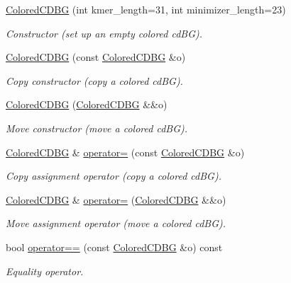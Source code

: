 \begin{DoxyCompactItemize}
\item 
\hyperlink{classColoredCDBG_aec6b5eb64fc7086bf81107849847071d}{Colored\+C\+D\+BG} (int kmer\+\_\+length=31, int minimizer\+\_\+length=23)
\begin{DoxyCompactList}\small\item\em Constructor (set up an empty colored cd\+BG). \end{DoxyCompactList}\item 
\hyperlink{classColoredCDBG_a8d2b4c5690efe813b6229a6e22343335}{Colored\+C\+D\+BG} (const \hyperlink{classColoredCDBG}{Colored\+C\+D\+BG} \&o)
\begin{DoxyCompactList}\small\item\em Copy constructor (copy a colored cd\+BG). \end{DoxyCompactList}\item 
\hyperlink{classColoredCDBG_a757b4744f396052946171021db1a1fb6}{Colored\+C\+D\+BG} (\hyperlink{classColoredCDBG}{Colored\+C\+D\+BG} \&\&o)
\begin{DoxyCompactList}\small\item\em Move constructor (move a colored cd\+BG). \end{DoxyCompactList}\item 
\hyperlink{classColoredCDBG}{Colored\+C\+D\+BG} \& \hyperlink{classColoredCDBG_a11b72ab0d9fb63f499a93f6735a1d76e}{operator=} (const \hyperlink{classColoredCDBG}{Colored\+C\+D\+BG} \&o)
\begin{DoxyCompactList}\small\item\em Copy assignment operator (copy a colored cd\+BG). \end{DoxyCompactList}\item 
\hyperlink{classColoredCDBG}{Colored\+C\+D\+BG} \& \hyperlink{classColoredCDBG_a8904ededa077f4b0ad5e8d795d7de0e6}{operator=} (\hyperlink{classColoredCDBG}{Colored\+C\+D\+BG} \&\&o)
\begin{DoxyCompactList}\small\item\em Move assignment operator (move a colored cd\+BG). \end{DoxyCompactList}\item 
bool \hyperlink{classColoredCDBG_a31d90c82590481d98b759f7302de90e6}{operator==} (const \hyperlink{classColoredCDBG}{Colored\+C\+D\+BG} \&o) const
\begin{DoxyCompactList}\small\item\em Equality operator. \end{DoxyCompactList}\item 

\end{DoxyCompactItemize}
